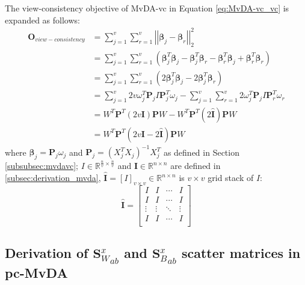 \begin{appendix}
    The view-consistency objective of MvDA-vc in Equation \eqref{eq:MvDA-vc_vc} is expanded as follows:
    \begin{equation}
        \begin{split}
            \boldsymbol{O}_{view-consistency} &= \sum_{j=1}^{v}\sum_{r=1}^{v}\left|\left|\boldsymbol{\beta}_j - \boldsymbol{\beta}_r\right|\right|_2^2 \\
            &= \sum_{j=1}^{v}\sum_{r=1}^{v}\left(\boldsymbol{\beta}_j^T\boldsymbol{\beta}_j - \boldsymbol{\beta}_j^T\boldsymbol{\beta}_r - \boldsymbol{\beta}_r^T\boldsymbol{\beta}_j + \boldsymbol{\beta}_r^T\boldsymbol{\beta}_r\right) \\
            &= \sum_{j=1}^{v}\sum_{r=1}^{v}\left(2\boldsymbol{\beta}_j^T\boldsymbol{\beta}_j - 2\boldsymbol{\beta}_j^T\boldsymbol{\beta}_r\right) \\
            &= \sum_{j=1}^{v}2v\omega_j^T\boldsymbol{P}_j I \boldsymbol{P}_j^T\omega_j - \sum_{j=1}^{v}\sum_{r=1}^{v}2\omega_j^T\boldsymbol{P}_j I \boldsymbol{P}_r^T\omega_r \\
            &= W^T \boldsymbol{P}^T \left(2v\boldsymbol{I}\right) \boldsymbol{P} W - W^T \boldsymbol{P}^T \left(2\boldsymbol{\widehat{I}}\right) \boldsymbol{P} W \\
            &= W^T \boldsymbol{P}^T \left(2v\boldsymbol{I} - 2\boldsymbol{\widehat{I}}\right) \boldsymbol{P} W
        \end{split}
        \label{eq:mvdavc_vc_derivation}
    \end{equation}
    where $\boldsymbol{\beta}_j = \boldsymbol{P}_j\omega_j$ and $\boldsymbol{P}_j = \left(X_j^T X_j\right)^{-1}X_j^T$ as defined in Section \ref{subsubsec:mvdavc}; $I \in \mathbb{R}^{\frac{n}{v}\times \frac{n}{v}}$ and $\boldsymbol{I} \in \mathbb{R}^{n\times n}$ are defined in \ref{subsec:derivation_mvda}, $\boldsymbol{\widehat{I}} = \left[I\right]_{v\times v} \in \mathbb{R}^{n\times n}$ is $v\times v$ grid stack of $I$:
    \begin{equation}
        \boldsymbol{\widehat{I}} = \left[\begin{matrix}I&I&\cdots&I\\I&I&\cdots&I\\\vdots&\vdots&\ddots&\vdots\\I&I&\cdots&I\\\end{matrix}\right]
    \end{equation}

\subsection{Derivation of \texorpdfstring{${\boldsymbol{S}^x_W}_{ab}$}{paired intra-class} and \texorpdfstring{${\boldsymbol{S}^x_B}_{ab}$}{paired inter-class} scatter matrices in pc-MvDA} \label{subsec:derivation_pcmvda}


\end{appendix}
